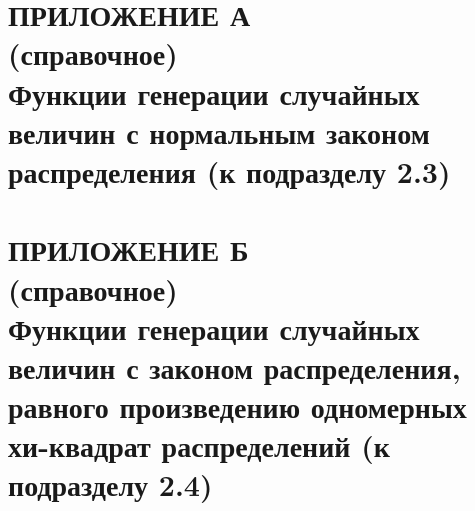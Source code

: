 \renewcommand{\thefigure}{\Asbuk{section}.\arabic{figure}}
\renewcommand{\thetable}{\Asbuk{section}.\arabic{table}}
\renewcommand{\thelstlisting}{\Asbuk{section}.\arabic{lstlisting}}

\pagestyle{fancy}
\fancyhf{} %
\fancyfoot[R]{\thepage}
\renewcommand{\headrulewidth}{0pt}
\renewcommand{\footrulewidth}{0pt}

\setlength{\headheight}{10mm}
\setlength{\headsep}{\baselineskip}

\section*{ПРИЛОЖЕНИЕ А\\(справочное)\\Функции генерации случайных величин
  с нормальным законом распределения (к подразделу 2.3)}

\thispagestyle{plain}
\setcounter{section}{1}
\setcounter{figure}{0}
\setcounter{table}{0}
\setcounter{lstlisting}{0}





\setlength{\headheight}{10mm}
\setlength{\headsep}{\baselineskip}
\section*{ПРИЛОЖЕНИЕ Б\\(справочное)\\Функции генерации случайных величин 
  с законом распределения, равного произведению одномерных хи-квадрат распределений
  (к подразделу 2.4)}

\thispagestyle{plain}
\setcounter{section}{2}
\setcounter{figure}{0}
\setcounter{table}{0}
\setcounter{lstlisting}{0}


